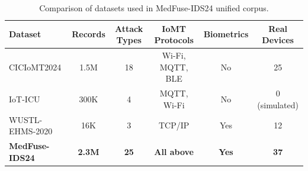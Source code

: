 \begin{table}[t]
\centering
\caption{Comparison of datasets used in MedFuse-IDS24 unified corpus.}
\label{tab:dataset_comparison}
\begin{tabular}{lccccc}
\hline
\textbf{Dataset} & \textbf{Records} & \textbf{Attack Types} & \textbf{IoMT Protocols} & \textbf{Biometrics} & \textbf{Real Devices} \\
\hline
CICIoMT2024 & 1.5M & 18 & Wi-Fi, MQTT, BLE & No & 25 \\
IoT-ICU & 300K & 4 & MQTT, Wi-Fi & No & 0 (simulated) \\
WUSTL-EHMS-2020 & 16K & 3 & TCP/IP & Yes & 12 \\
\hline
\textbf{MedFuse-IDS24} & \textbf{2.3M} & \textbf{25} & \textbf{All above} & \textbf{Yes} & \textbf{37} \\
\hline
\end{tabular}
\end{table}